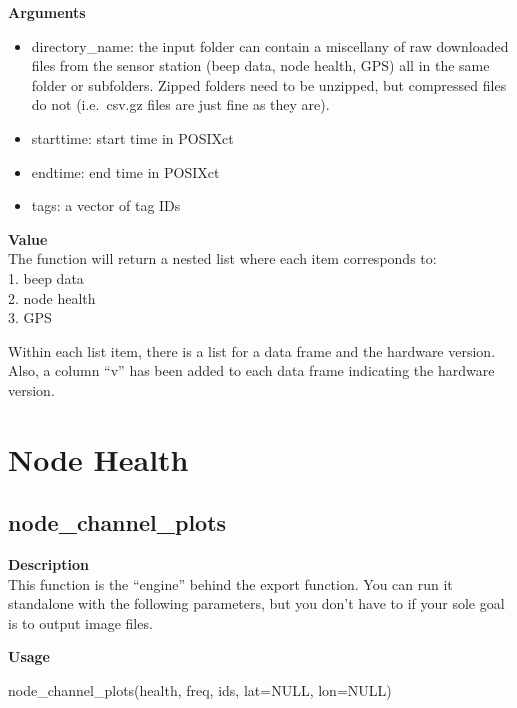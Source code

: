 \documentclass[
]{book}
\newenvironment{Shaded}{\begin{snugshade}}{\end{snugshade}}
\newcommand{\AttributeTok}[1]{\textcolor[rgb]{0.77,0.63,0.00}{#1}}
\newcommand{\ConstantTok}[1]{\textcolor[rgb]{0.00,0.00,0.00}{#1}}
\newcommand{\FunctionTok}[1]{\textcolor[rgb]{0.00,0.00,0.00}{#1}}
\newcommand{\NormalTok}[1]{#1}
\providecommand{\tightlist}{%
  \setlength{\itemsep}{0pt}\setlength{\parskip}{0pt}}
\begin{document}
\textbf{Arguments}

\begin{itemize}
\tightlist
\item
  directory\_name: the input folder can contain a miscellany of raw downloaded files from the sensor station (beep data, node health, GPS) all in the same folder or subfolders. Zipped folders need to be unzipped, but compressed files do not (i.e.~csv.gz files are just fine as they are).\\
\item
  starttime: start time in POSIXct\\
\item
  endtime: end time in POSIXct\\
\item
  tags: a vector of tag IDs
\end{itemize}

\textbf{Value}\\
The function will return a nested list where each item corresponds to:\\
1. beep data\\
2. node health\\
3. GPS

Within each list item, there is a list for a data frame and the hardware version. Also, a column ``v'' has been added to each data frame indicating the hardware version.

\hypertarget{node-health}{%
\section{Node Health}\label{node-health}}

\hypertarget{node_channel_plots}{%
\subsection{node\_channel\_plots}\label{node_channel_plots}}

\textbf{Description}\\
This function is the ``engine'' behind the export function. You can run it standalone with the following parameters, but you don't have to if your sole goal is to output image files.

\textbf{Usage}

\begin{Shaded}
\begin{Highlighting}[]
\FunctionTok{node\_channel\_plots}\NormalTok{(health, freq, ids, }\AttributeTok{lat=}\ConstantTok{NULL}\NormalTok{, }\AttributeTok{lon=}\ConstantTok{NULL}\NormalTok{)  }
\end{Highlighting}
\end{Shaded}
\end{document}
